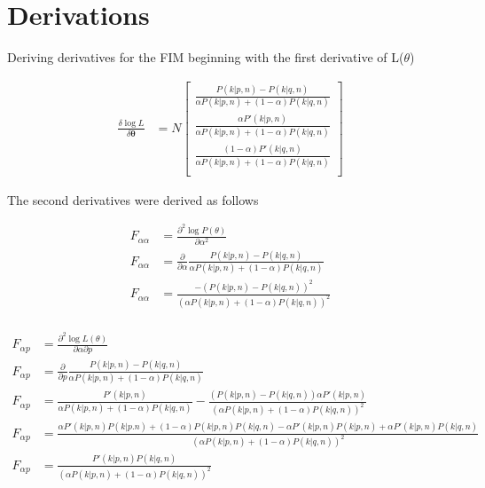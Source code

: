 \section{Derivations}
Deriving derivatives for the FIM beginning with the first derivative of L($\theta$)

\begin{align*}
\frac{\delta \log L}{\delta \mathbf{\theta}} &= N \begin{bmatrix} 
 \frac{P(k | p, n) - P(k | q, n)}{\alpha P(k | p, n) + (1-\alpha)P(k | q, n)} \\ 
\frac{\alpha P'(k | p, n)}{\alpha P(k | p, n) + (1-\alpha)P(k | q, n)} \\ 
\frac{(1 - \alpha) P'(k | q, n)}{\alpha P(k | p, n) + (1-\alpha)P(k | q, n)} \\  \end{bmatrix}
\end{align*}

The second derivatives were derived as follows

\begin{align*}
F_{\alpha\alpha} &= \frac{\partial^2\log P(\mathbb{\theta})}{\partial\alpha^2} \\
F_{\alpha\alpha} &= \frac{\partial}{\partial\alpha}\frac{P(k | p, n) - P(k | q, n)}{\alpha P(k | p, n) + (1-\alpha)P(k | q, n)} \\
F_{\alpha\alpha} &= \frac{-(P(k | p, n) - P(k | q, n))^2}{(\alpha P(k | p, n) + (1 - \alpha) P(k | q, n))^2} \\
\end{align*}

\begin{align*}
F_{\alpha p} &= \frac{\partial^2\log L(\mathbb{\theta})}{\partial\alpha\partial p} \\
F_{\alpha p} &= \frac{\partial}{\partial p}\frac{P(k | p, n) - P(k | q, n)}{\alpha P(k | p, n) + (1-\alpha)P(k | q, n)} \\
F_{\alpha p} &= \frac{P'(k | p, n)}{\alpha P(k | p, n) + (1-\alpha)P(k | q, n)} - \frac{(P(k | p, n) - P(k | q, n))\alpha P'(k | p, n)}{(\alpha P(k | p, n) + (1 - \alpha) P(k | q, n))^2} \\
F_{\alpha p} &= \frac{\alpha P'(k | p, n)P(k | p. n) + (1 - \alpha)P(k | p, n)P(k | q, n) - \alpha P'(k | p, n)P(k | p, n) + \alpha P'(k | p, n)P(k | q, n)}{(\alpha P(k | p, n) + (1 - \alpha) P(k | q, n))^2} \\
F_{\alpha p} &= \frac{P'(k | p, n)P(k | q, n)}{(\alpha P(k | p, n) + (1 - \alpha) P(k | q, n))^2}
\end{align*}

